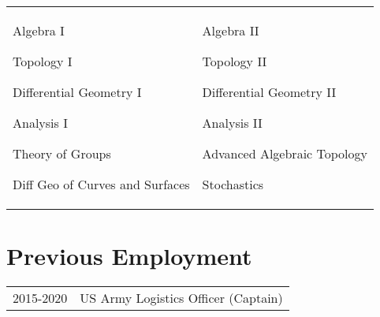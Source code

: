 \documentclass[margin,line,pifont,palatino,courier]{res}
\newenvironment{list1}{
  \begin{list}{\ding{113}}{%
      \setlength{\itemsep}{0in}
      \setlength{\parsep}{0in} \setlength{\parskip}{0in}
      \setlength{\topsep}{0in} \setlength{\partopsep}{0in}
      \setlength{\leftmargin}{0.17in}}}{\end{list}}
\begin{document}
\begin{resume}
\begin{tabular}{@{}p{2.3in}p{3in}}
  \begin{list1}
  \item Algebra I
  \item Topology I
  \item Differential Geometry I
  \item Analysis I
  \item Theory of Groups
  \item Diff Geo of Curves and Surfaces

  \end{list1}
  &
  \begin{list1}
  \item Algebra II
  \item Topology II
  \item Differential Geometry II
  \item Analysis II
  \item Advanced Algebraic Topology
  \item Stochastics
  \end{list1}

\end{tabular}

\section{\sc Previous Employment}

\begin{tabular}{@{}p{.6in}p{4in}}
2015-2020 & US Army Logistics Officer (Captain)\\
\end{tabular}







\end{resume}
\end{document}
